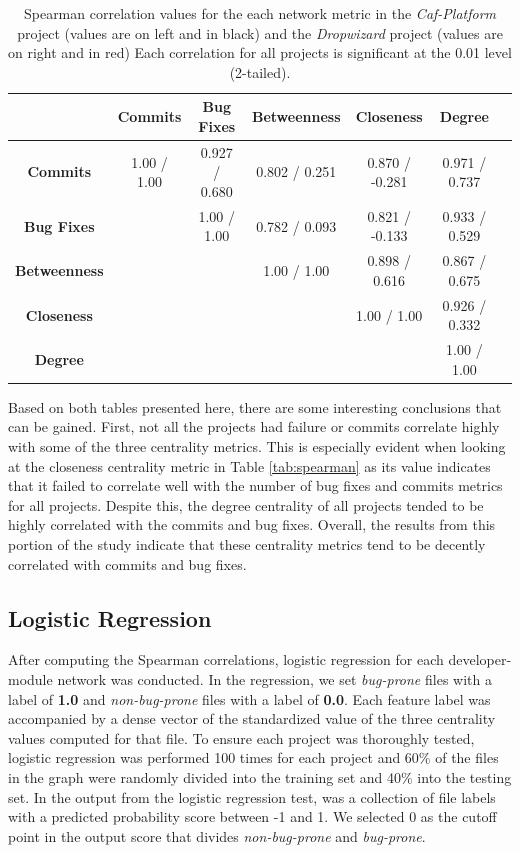 \documentclass{sig-alternate-05-2015}
\begin{document}
\begin{table}
\centering
\caption{Spearman correlation values for the each network metric in the \textit{Caf-Platform} project (values are on left and in black) and the \textit{Dropwizard} project (values are on right and in red) Each correlation for all projects is significant at the 0.01 level (2-tailed).}
\label{tab:spearman_diff}
\begin{tabular}{|c|c|c|c|c|c|c|} \hline
&\textbf{Commits}&\textbf{Bug Fixes}&\textbf{Betweenness}&\textbf{Closeness}&\textbf{Degree}\\ \hline
\textbf{Commits}&1.00 / {\color{red} 1.00}&0.927 / {\color{red} 0.680}&0.802 / {\color{red} 0.251}&0.870 / {\color{red} -0.281}&0.971 / {\color{red} 0.737}\\ \hline
\textbf{Bug Fixes}&&1.00 / {\color{red} 1.00}&0.782 / {\color{red} 0.093}&0.821 / {\color{red} -0.133}&0.933 / {\color{red} 0.529}\\ \hline
\textbf{Betweenness}&&&1.00 / {\color{red} 1.00}&0.898 / {\color{red} 0.616}&0.867 / {\color{red} 0.675}\\ \hline
\textbf{Closeness}&&&&1.00 / {\color{red} 1.00}&0.926 / {\color{red} 0.332}\\ \hline
\textbf{Degree}&&&&&1.00 / {\color{red} 1.00}\\ \hline
\end{tabular}
\end{table}

Based on both tables presented here, there are some interesting conclusions that can be gained. First, not all the projects had failure or commits correlate highly with some of the three centrality metrics. This is especially evident when looking at the closeness centrality metric in Table \ref{tab:spearman} as its value indicates that it failed to correlate well with the number of bug fixes and commits metrics for all projects. Despite this, the degree centrality of all projects tended to be highly correlated with the commits and bug fixes. Overall, the results from this portion of the study indicate that these centrality metrics tend to be decently correlated with commits and bug fixes.

\subsection{Logistic Regression}
After computing the Spearman correlations, logistic regression for each developer-module network was conducted. In the regression, we set \textit{bug-prone} files with a label of \textbf{1.0} and \textit{non-bug-prone} files with a label of \textbf{0.0}. Each feature label was accompanied by a dense vector of the standardized value of the three centrality values computed for that file. To ensure each project was thoroughly tested, logistic regression was performed 100 times for each project and 60\% of the files in the graph were randomly divided into the training set and 40\% into the testing set. In the output from the logistic regression test, was a collection of file labels with a predicted probability score between -1 and 1. We selected 0 as the cutoff point in the output score that divides \textit{non-bug-prone} and \textit{bug-prone}.
\end{document}
